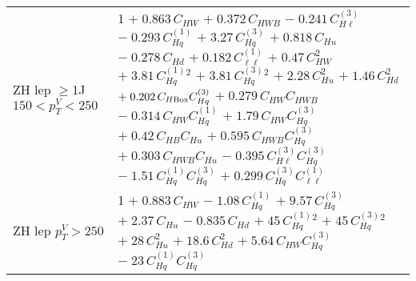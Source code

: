 \begin{tabular}{l|p{}}
    ZH lep $\geq$1J $150 < p_{T}^{V} < 250$ & 1 $+\;0.863\,C_{HW}$ $+\;0.372\,C_{HWB}$ $-\;0.241\,C^{(3)}_{H\ell}$ $-\;0.293\,C^{(1)}_{Hq}$ $+\;3.27\,C^{(3)}_{Hq}$ $+\;0.818\,C_{Hu}$ $-\;0.278\,C_{Hd}$ $+\;0.182\,C^{(1)}_{\ell\ell}$ $+\;0.47\,C_{HW}^{2}$ $+\;3.81\,C^{(1)}_{Hq}^{2}$ $+\;3.81\,C^{(3)}_{Hq}^{2}$ $+\;2.28\,C_{Hu}^{2}$ $+\;1.46\,C_{Hd}^{2}$ $+\;0.202\,C_{H\rm{Box}}C^{(3)}_{Hq}$ $+\;0.279\,C_{HW}C_{HWB}$ $-\;0.314\,C_{HW}C^{(1)}_{Hq}$ $+\;1.79\,C_{HW}C^{(3)}_{Hq}$ $+\;0.42\,C_{HB}C_{Hu}$ $+\;0.595\,C_{HWB}C^{(3)}_{Hq}$ $+\;0.303\,C_{HWB}C_{Hu}$ $-\;0.395\,C^{(3)}_{H\ell}C^{(3)}_{Hq}$ $-\;1.51\,C^{(1)}_{Hq}C^{(3)}_{Hq}$ $+\;0.299\,C^{(3)}_{Hq}C^{(1)}_{\ell\ell}$ \\
    ZH lep $p_{T}^{V} > 250$ & 1 $+\;0.883\,C_{HW}$ $-\;1.08\,C^{(1)}_{Hq}$ $+\;9.57\,C^{(3)}_{Hq}$ $+\;2.37\,C_{Hu}$ $-\;0.835\,C_{Hd}$ $+\;45\,C^{(1)}_{Hq}^{2}$ $+\;45\,C^{(3)}_{Hq}^{2}$ $+\;28\,C_{Hu}^{2}$ $+\;18.6\,C_{Hd}^{2}$ $+\;5.64\,C_{HW}C^{(3)}_{Hq}$ $-\;23\,C^{(1)}_{Hq}C^{(3)}_{Hq}$ \\
    \hline
\end{tabular}